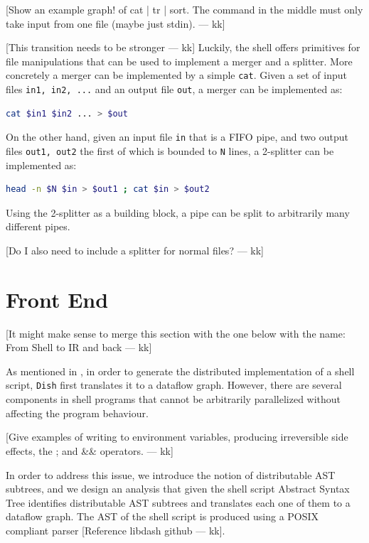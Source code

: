 \documentclass[sigplan,10pt,review,anonymous]{acmart}
\newcommand{\kk}[1]{[{\color{magenta}#1 --- kk}]}
\begin{document}
\kk{Show an example graph! of cat | tr | sort. The command in the
  middle must only take input from one file (maybe just stdin).}

\kk{This transition needs to be stronger} Luckily, the shell offers
primitives for file manipulations that can be used to implement a
merger and a splitter. More concretely a merger can be implemented by
a simple \verb|cat|. Given a set of input files \verb|in1, in2, ...|
and an output file \verb|out|, a merger can be implemented as:

\begin{lstlisting}[language=sh, float=h, numbers=none]
 cat $in1 $in2 ... > $out
\end{lstlisting}

\noindent
On the other hand, given an input file \verb|in| that is a FIFO pipe,
and two output files \verb|out1, out2| the first of which is bounded
to \verb|N| lines, a 2-splitter can be implemented as:

\begin{lstlisting}[language=sh, float=h, numbers=none]
 head -n $N $in > $out1 ; cat $in > $out2
\end{lstlisting}

\noindent
Using the 2-splitter as a building block, a pipe can be split to
arbitrarily many different pipes.

\kk{Do I also need to include a splitter for normal files?}

\section{Front End}

\kk{It might make sense to merge this section with the one below with
  the name: From Shell to IR and back}

As mentioned in , in order to generate the distributed
implementation of a shell script, \texttt{Dish} first translates it to
a dataflow graph. However, there are several components in shell
programs that cannot be arbitrarily parallelized without affecting the
program behaviour.

\kk{Give examples of writing to environment variables, producing
  irreversible side effects, the ; and \&\& operators.}

In order to address this issue, we introduce the notion of
distributable AST subtrees, and we design an analysis that given the
shell script Abstract Syntax Tree identifies distributable AST
subtrees and translates each one of them to a dataflow graph. The AST
of the shell script is produced using a POSIX compliant parser
\kk{Reference libdash github}.
\end{document}
